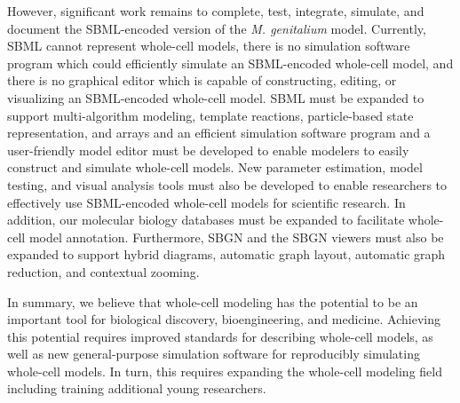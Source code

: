 \documentclass[journal,transmag]{IEEEtran}
\begin{document}
However, significant work remains to complete, test, integrate, simulate, and document the SBML-encoded version of the \textit{M. genitalium} model. Currently, SBML cannot represent whole-cell models, there is no simulation software program which could efficiently simulate an SBML-encoded whole-cell model, and there is no graphical editor which is capable of constructing, editing, or visualizing an SBML-encoded whole-cell model. SBML must be expanded to support multi-algorithm modeling, template reactions, particle-based state representation, and arrays and an efficient simulation software program and a user-friendly model editor must be developed to enable modelers to easily construct and simulate whole-cell models. New parameter estimation, model testing, and visual analysis tools must also be developed to enable researchers to effectively use SBML-encoded whole-cell models for scientific research. In addition, our molecular biology databases must be expanded to facilitate whole-cell model annotation. Furthermore, SBGN and the SBGN viewers must also be expanded to support hybrid diagrams, automatic graph layout, automatic graph reduction, and contextual zooming.

In summary, we believe that whole-cell modeling has the potential to be an important tool for biological discovery, bioengineering, and medicine. Achieving this potential requires improved standards for describing whole-cell models, as well as new general-purpose simulation software for reproducibly simulating whole-cell models. In turn, this requires expanding the whole-cell modeling field including training additional young researchers.

\ifCLASSOPTIONcaptionsoff
  \newpage
\fi




% 
\end{document}
